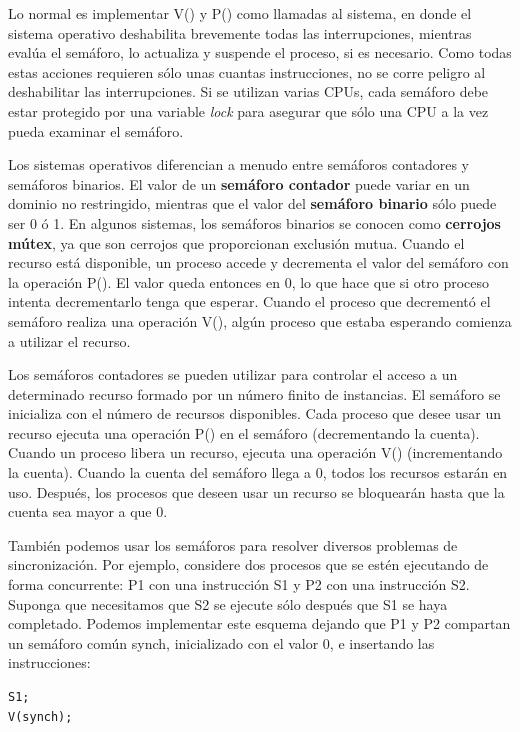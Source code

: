 \documentclass[10pt]{book}
\begin{document}
Lo normal es implementar {\mf V()} y {\mf P()} como llamadas al sistema, en donde el sistema operativo deshabilita brevemente todas las interrupciones, mientras evalúa el semáforo, lo actualiza y suspende el proceso, si es necesario. Como todas estas acciones requieren sólo unas cuantas instrucciones, no se corre peligro al deshabilitar las interrupciones. Si se utilizan varias CPUs, cada semáforo debe estar protegido por una variable \textit{lock} para asegurar que sólo una CPU a la vez pueda examinar el semáforo.

Los sistemas operativos diferencian a menudo entre semáforos contadores y semáforos binarios. El valor de un \textbf{semáforo contador} puede variar en un dominio no restringido, mientras que el valor del \textbf{semáforo binario} sólo puede ser 0 ó 1. En algunos sistemas, los semáforos binarios se conocen como \textbf{cerrojos mútex}, ya que son cerrojos que proporcionan exclusión mutua. Cuando el recurso está disponible, un proceso accede y decrementa el valor del semáforo con la operación {\mf P()}. El valor queda entonces en 0, lo que hace que si otro proceso intenta decrementarlo tenga que esperar. Cuando el proceso que decrementó el semáforo realiza una operación {\mf V()}, algún proceso que estaba esperando comienza a utilizar el recurso.

Los semáforos contadores se pueden utilizar para controlar el acceso a un determinado recurso formado por un número finito de instancias. El semáforo se inicializa con el número de recursos disponibles. Cada proceso que desee usar un recurso ejecuta una operación {\mf P()} en el semáforo (decrementando la cuenta). Cuando un proceso libera un recurso, ejecuta una operación {\mf V()} (incrementando la cuenta). Cuando la cuenta del semáforo llega a 0, todos los recursos estarán en uso. Después, los procesos que deseen usar un recurso se bloquearán hasta que la cuenta sea mayor a que 0.

También podemos usar los semáforos para resolver diversos problemas de sincronización. Por ejemplo, considere dos procesos que se estén ejecutando de forma concurrente: {\mf P1} con una instrucción {\mf S1} y {\mf P2} con una instrucción {\mf S2}. Suponga que necesitamos que {\mf S2} se ejecute sólo después que {\mf S1} se haya completado. Podemos implementar este esquema dejando que {\mf P1} y {\mf P2} compartan un semáforo común {\mf synch}, inicializado con el valor 0, e insertando las instrucciones:

\begin{lstlisting}
S1;
V(synch);
\end{lstlisting}
\end{document}
